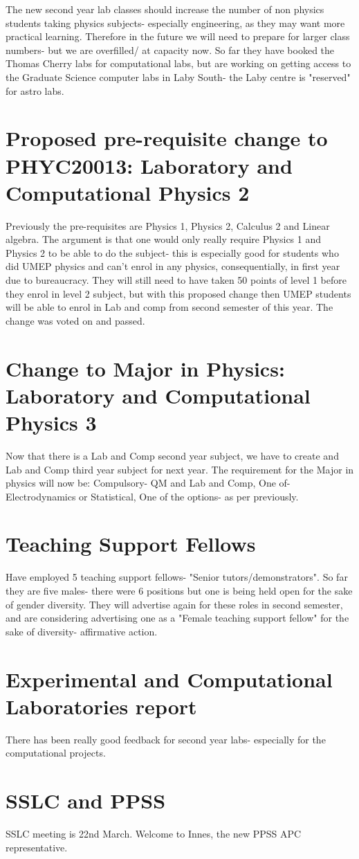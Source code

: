 \documentclass[11pt, oneside]{article}   	%
\begin{document}
The new second year lab classes should increase the number of non physics students taking physics subjects- especially engineering, as they may want more practical learning. Therefore in the future we will need to prepare for larger class numbers- but we are overfilled/ at capacity now. So far they have booked the Thomas Cherry labs for computational labs, but are working on getting access to the Graduate Science computer labs in Laby South- the Laby centre is "reserved" for astro labs. \\

\section{Proposed pre-requisite change to PHYC20013: Laboratory and Computational Physics 2}

Previously the pre-requisites are Physics 1, Physics 2, Calculus 2 and Linear algebra. The argument is that one would only really require Physics 1 and Physics 2 to be able to do the subject- this is especially good for students who did UMEP physics and can't enrol in any physics, consequentially, in first year due to bureaucracy. They will still need to have taken 50 points of level 1 before they enrol in level 2 subject, but with this proposed change then UMEP students will be able to enrol in Lab and comp from second semester of this year. The change was voted on and passed. 

\section{Change to Major in Physics: Laboratory and Computational Physics 3}
Now that there is a Lab and Comp second year subject, we have to create and Lab and Comp third year subject for next year. The requirement for the Major in physics will now be: Compulsory- QM and Lab and Comp, One of- Electrodynamics or Statistical, One of the options- as per previously. 

\section{Teaching Support Fellows}
Have employed 5 teaching support fellows- "Senior tutors/demonstrators". So far they are five males- there were 6 positions but one is being held open for the sake of gender diversity. They will advertise again for these roles in second semester, and are considering advertising one as a "Female teaching support fellow" for the sake of diversity- affirmative action. 

\section{Experimental and Computational Laboratories report}
There has been really good feedback for second year labs- especially for the computational projects. 

\section{SSLC and PPSS}
SSLC meeting is 22nd March. Welcome to Innes, the new PPSS APC representative. 
\end{document}
